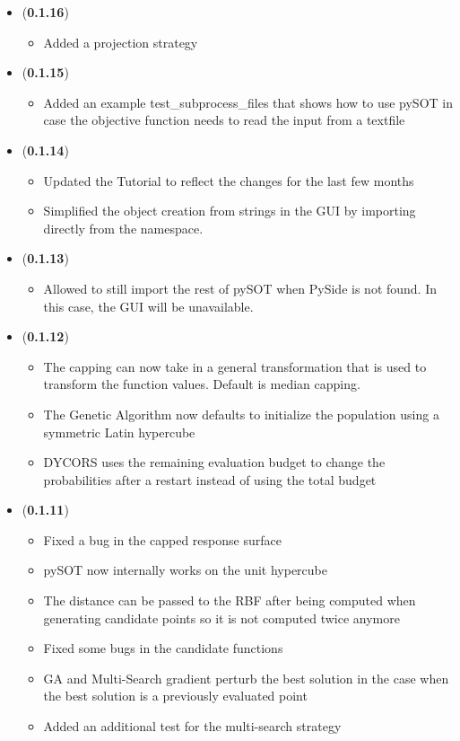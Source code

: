 \documentclass[]{article}
\begin{document}
\begin{itemize}
	\item (\textbf{0.1.16})
	\begin{itemize}
		\item Added a projection strategy
	\end{itemize}

	\item (\textbf{0.1.15})
	\begin{itemize}
		\item Added an example test\_subprocess\_files that shows how to use pySOT in 
		case the objective function needs to read the input from a textfile
	\end{itemize}

	\item (\textbf{0.1.14}) 
	\begin{itemize}
		\item Updated the Tutorial to reflect the changes for the last few months
		\item Simplified the object creation from strings in the GUI by importing directly from the namespace.
	\end{itemize}

	\item (\textbf{0.1.13}) 
	\begin{itemize}
		\item Allowed to still import the rest of pySOT when PySide is not found. In this case, the 
		GUI will be unavailable.
	\end{itemize}

	\item (\textbf{0.1.12}) 
	\begin{itemize}
		\item The capping can now take in a general transformation that is used to transform the function 
		values. Default is median capping.
		\item The Genetic Algorithm now defaults to initialize the population using a symmetric Latin hypercube
		\item DYCORS uses the remaining evaluation budget to change the probabilities after a restart instead 
		of using the total budget 
	\end{itemize}

	\item (\textbf{0.1.11}) 
	\begin{itemize}
		\item Fixed a bug in the capped response surface
		\item pySOT now internally works on the unit hypercube
		\item The distance can be passed to the RBF after being computed when generating candidate points 
		so it is not computed twice anymore
		\item Fixed some bugs in the candidate functions
		\item GA and Multi-Search gradient perturb the best solution in the case when the best solution is a 
		previously evaluated point
		\item Added an additional test for the multi-search strategy
	\end{itemize}


\end{itemize}
\end{document}
